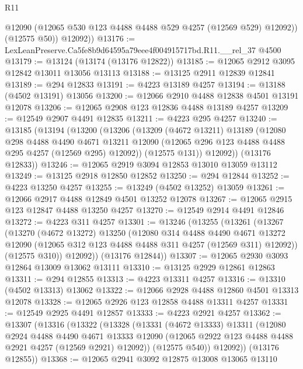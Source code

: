 \begin{lexlean}{R11}
\begin{coremodule}
            @12090
            (@12065 @530 @123 @4488 @4488 @529 @4257 (@12569 @529) @12092))
          (@12575 @50))
        @12092))
@13176 := LexLeanPreserve.Ca5fe8b9d64595a79eee4f004915717bd.R11.__rel_37 @4500
@13179 := @13124 (@13174 (@13176 @12822))
@13185 := @12065 @2912 @3095 @12842 @13011 @13056 @13113
@13188 := @13125 @2911 @12839 @12841
@13189 := @294 @12833
@13191 := @4223 @13189 @4257
@13194 := @13188 (@4502 @13191) @13056
@13200 := @12066 @2910 @4488 @12838 @4501 @13191 @12078
@13206 := @12065 @2908 @123 @12836 @4488 @13189 @4257
@13209 := @12549 @2907 @4491 @12835
@13211 := @4223 @295 @4257
@13240 := @13185
    (@13194
      (@13200
        (@13206
          (@13209
            (@4672 @13211)
            @13189
            (@12080
              @298
              @4488
              @4490
              @4671
              @13211
              @12090
              (@12065 @296 @123 @4488 @4488 @295 @4257 (@12569 @295) @12092))
            (@12575 @131))
          @12092))
      (@13176 @12833))
@13246 := @12065 @2919 @3094 @12853 @13010 @13059 @13112
@13249 := @13125 @2918 @12850 @12852
@13250 := @294 @12844
@13252 := @4223 @13250 @4257
@13255 := @13249 (@4502 @13252) @13059
@13261 := @12066 @2917 @4488 @12849 @4501 @13252 @12078
@13267 := @12065 @2915 @123 @12847 @4488 @13250 @4257
@13270 := @12549 @2914 @4491 @12846
@13272 := @4223 @311 @4257
@13301 := @13246
    (@13255
      (@13261
        (@13267
          (@13270
            (@4672 @13272)
            @13250
            (@12080
              @314
              @4488
              @4490
              @4671
              @13272
              @12090
              (@12065 @312 @123 @4488 @4488 @311 @4257 (@12569 @311) @12092))
            (@12575 @310))
          @12092))
      (@13176 @12844))
@13307 := @12065 @2930 @3093 @12864 @13009 @13062 @13111
@13310 := @13125 @2929 @12861 @12863
@13311 := @294 @12855
@13313 := @4223 @13311 @4257
@13316 := @13310 (@4502 @13313) @13062
@13322 := @12066 @2928 @4488 @12860 @4501 @13313 @12078
@13328 := @12065 @2926 @123 @12858 @4488 @13311 @4257
@13331 := @12549 @2925 @4491 @12857
@13333 := @4223 @2921 @4257
@13362 := @13307
    (@13316
      (@13322
        (@13328
          (@13331
            (@4672 @13333)
            @13311
            (@12080
              @2924
              @4488
              @4490
              @4671
              @13333
              @12090
              (@12065 @2922 @123 @4488 @4488 @2921 @4257 (@12569 @2921) @12092))
            (@12575 @540))
          @12092))
      (@13176 @12855))
@13368 := @12065 @2941 @3092 @12875 @13008 @13065 @13110

\end{coremodule}
\end{lexlean}
